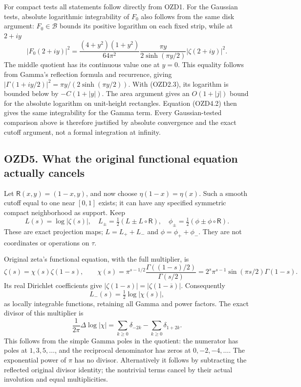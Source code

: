 For compact tests all statements follow directly from OZD1. For the
Gaussian tests, absolute logarithmic integrability of \(F_0\) also
follows from the same disk argument: \(F_0\in\mathcal B\) bounds its
positive logarithm on each fixed strip, while at \(2+iy\) \[
|F_0(2+iy)|^2=
\frac{(4+y^2)(1+y^2)}{64\pi^2}
\frac{\pi y}{2\sinh(\pi y/2)}|\zeta(2+iy)|^2.
\tag{OZD4.4}
\] The middle quotient has its continuous value one at \(y=0\). This
equality follows from Gamma's reflection formula and recurrence, giving
\(|\Gamma(1+iy/2)|^2=\pi y/(2\sinh(\pi y/2))\). With (OZD2.3), its
logarithm is bounded below by \(-C(1+|y|)\). The area argument gives an
\(O(1+|j|)\) bound for the absolute logarithm on unit-height rectangles.
Equation (OZD4.2) then gives the same integrability for the Gamma term.
Every Gaussian-tested comparison above is therefore justified by
absolute convergence and the exact cutoff argument, not a formal
integration at infinity.

\subsection{OZD5. What the original functional equation actually
cancels}\label{ozd5.-what-the-original-functional-equation-actually-cancels}

Let \(\mathsf R(x,y)=(1-x,y)\), and now choose \(\eta(1-x)=\eta(x)\).
Such a smooth cutoff equal to one near \([0,1]\) exists; it can have any
specified symmetric compact neighborhood as support. Keep \[
L(s)=\log|\zeta(s)|,\quad
L_\pm=\tfrac12(L\pm L\circ\mathsf R),\quad
\phi_\pm=\tfrac12(\phi\pm\phi\circ\mathsf R).
\tag{OZD5.1}
\] These are exact projection maps; \(L=L_++L_-\) and
\(\phi=\phi_++\phi_-\). They are not coordinates or operations on
\(\tau\).

Original zeta's functional equation, with the full multiplier, is \[
\zeta(s)=\chi(s)\zeta(1-s),\qquad
\chi(s)=\pi^{s-1/2}\frac{\Gamma((1-s)/2)}{\Gamma(s/2)}
=2^s\pi^{s-1}\sin(\pi s/2)\Gamma(1-s).
\tag{OZD5.2}
\] Its real Dirichlet coefficients give
\(|\zeta(1-s)|=|\zeta(1-\overline s)|\). Consequently \[
L_-(s)=\tfrac12\log|\chi(s)|,
\tag{OZD5.3}
\] as locally integrable functions, retaining all Gamma and power
factors. The exact divisor of this multiplier is \[
\frac1{2\pi}\Delta\log|\chi|
=\sum_{k\ge0}\delta_{-2k}-\sum_{k\ge0}\delta_{1+2k}.
\tag{OZD5.4}
\] This follows from the simple Gamma poles in the quotient: the
numerator has poles at \(1,3,5,\ldots\), and the reciprocal denominator
has zeros at \(0,-2,-4,\ldots\). The exponential power of \(\pi\) has no
divisor. Alternatively it follows by subtracting the reflected original
divisor identity; the nontrivial terms cancel by their actual involution
and equal multiplicities.


